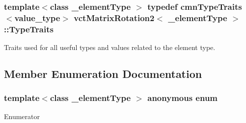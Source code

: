 \hypertarget{classvct_matrix_rotation2_aaa741677f3a705c18adc25e022a5fa5c}{
\subsubsection[{Type\-Traits}]{\setlength{\rightskip}{0pt plus 5cm}template$<$class \-\_\-element\-Type $>$ typedef {\bf cmn\-Type\-Traits}$<$value\-\_\-type$>$ {\bf vct\-Matrix\-Rotation2}$<$ \-\_\-element\-Type $>$\-::{\bf Type\-Traits}}}\label{classvct_matrix_rotation2_aaa741677f3a705c18adc25e022a5fa5c}
Traits used for all useful types and values related to the element type. 

\subsection{Member Enumeration Documentation}
\hypertarget{classvct_matrix_rotation2_ac2875a62bcfe1fb310808a4aff444120}{\subsubsection[{anonymous enum}]{\setlength{\rightskip}{0pt plus 5cm}template$<$class \-\_\-element\-Type $>$ anonymous enum}}\label{classvct_matrix_rotation2_ac2875a62bcfe1fb310808a4aff444120}
\begin{Desc}
\item[Enumerator]\par
\begin{description}
\item[{\em 
\hypertarget{classvct_matrix_rotation2_ac2875a62bcfe1fb310808a4aff444120a405943de2af4c1dae37a90156248a41b}{R\-O\-W\-S}\label{classvct_matrix_rotation2_ac2875a62bcfe1fb310808a4aff444120a405943de2af4c1dae37a90156248a41b}
}]\item[{\em 
\hypertarget{classvct_matrix_rotation2_ac2875a62bcfe1fb310808a4aff444120a3f895b9e3be292e80920a74194301b11}{C\-O\-L\-S}\label{classvct_matrix_rotation2_ac2875a62bcfe1fb310808a4aff444120a3f895b9e3be292e80920a74194301b11}
}]\end{description}
\end{Desc}
